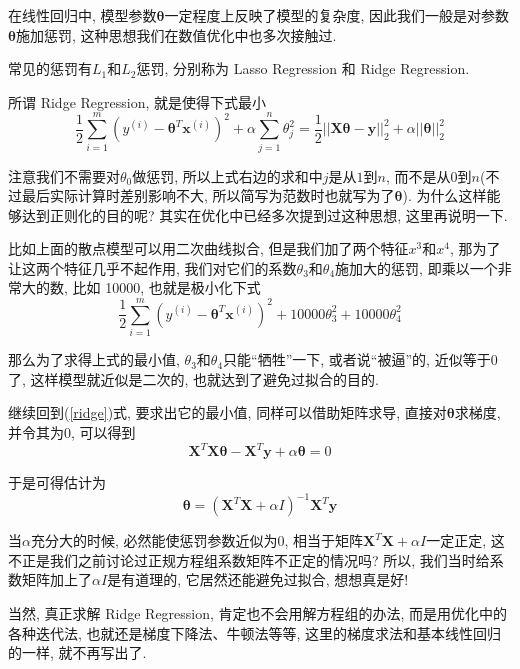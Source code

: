 \documentclass[a4paper,UTF8]{ctexart}
\theoremstyle{plain} \newtheorem{theorem}{定理}[section]
\theoremstyle{plain} \newtheorem{definition}{定义}[section]
\theoremstyle{plain} \newtheorem{lemma}{引理}[section]
\theoremstyle{plain} \newtheorem{proposition}{命题}[section]
\theoremstyle{plain} \newtheorem{example}{例}[section]
\theoremstyle{plain} \newtheorem{remark}{注}[section]
\theoremstyle{plain} \newtheorem{corollary}{推论}[section]
\begin{document}
在线性回归中, 模型参数$\bm{\theta}$一定程度上反映了模型的复杂度, 因此我们一般是对参数$\bm{\theta}$施加惩罚, 这种思想我们在数值优化中也多次接触过.

常见的惩罚有$L_{1}$和$L_{2}$惩罚, 分别称为 Lasso Regression 和 Ridge Regression.

所谓 Ridge Regression, 就是使得下式最小
\begin{equation}\label{ridge}
\frac{1}{2} \sum_{i=1}^{m} (y^{(i)} - \bm{\theta}^{T} \bm{x}^{(i)})^2  + \alpha \sum_{j=1}^{n} \theta_{j}^{2} = \frac{1}{2} ||\bm{X} \bm{\theta} -\bm{y}||_{2}^{2} + \alpha ||\bm{\theta}||_{2}^{2}
\end{equation}

注意我们不需要对$\theta_0$做惩罚, 所以上式右边的求和中$j$是从$1$到$n$, 而不是从$0$到$n$(不过最后实际计算时差别影响不大, 所以简写为范数时也就写为了$\bm{\theta}$). 为什么这样能够达到正则化的目的呢? 其实在优化中已经多次提到过这种思想, 这里再说明一下.

比如上面的散点模型可以用二次曲线拟合, 但是我们加了两个特征$x^3$和$x^4$, 那为了让这两个特征几乎不起作用, 我们对它们的系数$\theta_3$和$\theta_4$施加大的惩罚, 即乘以一个非常大的数, 比如 10000, 也就是极小化下式
\begin{equation*}
\frac{1}{2} \sum_{i=1}^{m} (y^{(i)} - \bm{\theta}^{T} \bm{x}^{(i)})^2 + 10000 \theta_{3}^{2} + 10000 \theta_{4}^{2}
\end{equation*}

那么为了求得上式的最小值, $\theta_3$和$\theta_4$只能“牺牲”一下, 或者说“被逼”的, 近似等于$0$了, 这样模型就近似是二次的, 也就达到了避免过拟合的目的.

继续回到(\ref{ridge})式, 要求出它的最小值, 同样可以借助矩阵求导, 直接对$\bm{\theta}$求梯度, 并令其为$0$, 可以得到
\begin{equation*}
\bm{X}^{T} \bm{X} \bm{\theta} - \bm{X}^{T} \bm{y} + \alpha \bm{\theta} = 0
\end{equation*}

于是可得估计为
\begin{equation*}
\bm{\theta} = (\bm{X}^{T} \bm{X} + \alpha I)^{-1} \bm{X}^{T} \bm{y}
\end{equation*}

当$\alpha$充分大的时候, 必然能使惩罚参数近似为$0$, 相当于矩阵$\bm{X}^{T} \bm{X} + \alpha I$一定正定, 这不正是我们之前讨论过正规方程组系数矩阵不正定的情况吗? 所以, 我们当时给系数矩阵加上了$\alpha I$是有道理的, 它居然还能避免过拟合, 想想真是好!

当然, 真正求解 Ridge Regression, 肯定也不会用解方程组的办法, 而是用优化中的各种迭代法, 也就还是梯度下降法、牛顿法等等, 这里的梯度求法和基本线性回归的一样, 就不再写出了.
\end{document}
